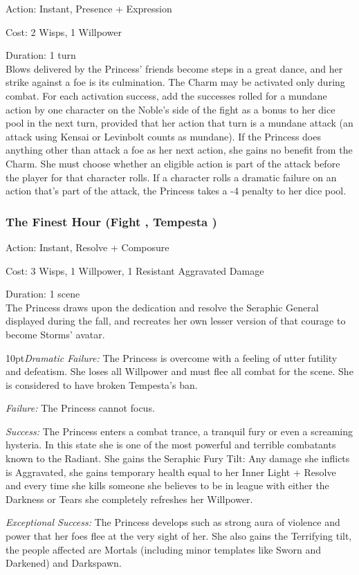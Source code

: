 \noindent Action: Instant, Presence + Expression

\noindent Cost: 2 Wisps, 1 Willpower

\noindent Duration: 1 turn\\

\noindent Blows delivered by the Princess' friends become steps in a great dance, and her strike against a foe is its culmination. The Charm may be activated only during combat. For each activation success, add the successes rolled for a mundane action by one character on the Noble's side of the fight as a bonus to her dice pool in the next turn, provided that her action that turn is a mundane attack (an attack using Kensai or Levinbolt counts as mundane). If the Princess does anything other than attack a foe as her next action, she gains no benefit from the Charm. She must choose whether an eligible action is part of the attack before the player for that character rolls. If a character rolls a dramatic failure on an action that's part of the attack, the Princess takes a -4 penalty to her dice pool.

\subsubsection*{The Finest Hour (Fight \textbullet\textbullet\textbullet\textbullet\textbullet, Tempesta \textbullet\textbullet\textbullet\textbullet)}

\noindent Action: Instant, Resolve + Composure

\noindent Cost: 3 Wisps, 1 Willpower, 1 Resistant Aggravated Damage

\noindent Duration: 1 scene \\

\noindent The Princess draws upon the dedication and resolve the Seraphic General displayed during the fall, and recreates her own lesser version of that courage to become Storms' avatar. 

    \begin{myindentpar}{10pt}\emph{Dramatic Failure:} The Princess is overcome with a feeling of utter futility and defeatism. She loses all Willpower and must flee all combat for the scene. She is considered to have broken Tempesta's ban.

    \emph{Failure:} The Princess cannot focus.

    \emph{Success:} The Princess enters a combat trance, a tranquil fury or even a screaming hysteria. In this state she is one of the most powerful and terrible combatants known to the Radiant. She gains the Seraphic Fury Tilt: Any damage she inflicts is Aggravated, she gains temporary health equal to her Inner Light + Resolve and every time she kills someone she believes to be in league with either the Darkness or Tears she completely refreshes her Willpower.

    \emph{Exceptional Success:} The Princess develops such as strong aura of violence and power that her foes flee at the very sight of her. She also gains the Terrifying tilt, the people affected are Mortals (including minor templates like Sworn and Darkened) and Darkspawn.\end{myindentpar}


